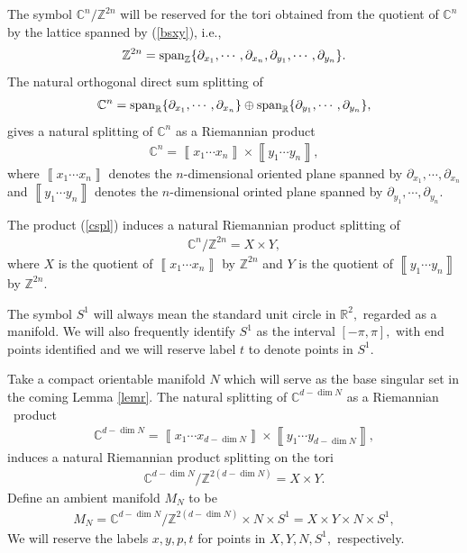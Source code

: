\documentclass[11pt,a4paper]{amsart}
\numberwithin{equation}{section}
\newcommand{\cd}{\cdots}
\newcommand{\cu}[1]{\left\llbracket#1\right\rrbracket}
\newcommand{\cz}{\C^{d-\dim N}/\Z^{2(d-\dim N)}}
\newcommand{\pd}{\partial}
\newcommand{\R}{\mathbb{R}}
\newcommand{\Z}{\mathbb{Z}}
\newcommand{\C}{\mathbb{C}}
\theoremstyle{plain}
\theoremstyle{definition}
\numberwithin{equation}{subsection}
\begin{document}
	The symbol $\C^n/\Z^{2n}$ will be reserved for the tori obtained from the quotient of $\C^n$ by the lattice spanned by (\ref{bsxy}), i.e.,
	\begin{align*}
		\Z^{2n}=\textnormal{span}_{\Z}\{\pd_{x_1},\cd,\pd_{x_n},\pd_{y_1},\cd,\pd_{y_n}\}.
	\end{align*}
	The natural orthogonal direct sum splitting of 
	\begin{align*}
		\C^n=\textnormal{span}_{\R}\{\pd_{x_1},\cd,\pd_{x_n}\}\oplus\textnormal{span}_{\R}\{\pd_{y_1},\cd,\pd_{y_n}\},
	\end{align*}
	gives a natural splitting of $\C^n$ as a Riemannian product
	\begin{align}\label{cspl}
		\C^n=\cu{x_1\cd x_n}\times \cu{y_1\cd y_n},
	\end{align}
	where $\cu{x_1\cd x_n}$ denotes the $n$-dimensional oriented plane spanned by $\pd_{x_1},\cd,\pd_{x_n}$ and $\cu{y_1\cd y_n}$ denotes the $n$-dimensional orinted plane spanned by $\pd_{y_1},\cd,\pd_{y_n}.$
	
	The product (\ref{cspl}) induces a natural Riemannian product splitting of
	\begin{align*}
		\C^n/\Z^{2n}=X\times Y,
	\end{align*}
	where $X$ is the quotient of $\cu{x_1\cd x_n}$ by $\Z^{2n}$ and $Y$ is the quotient of $\cu{y_1\cd y_n}$ by $\Z^{2n}.$
	
	The symbol $S^1$ will always mean the standard unit circle in $\R^2,$ regarded as a manifold. We will also frequently identify $S^1$ as the interval
	$
	[-{\pi}{},{\pi}{}],
	$ with end points identified and we will reserve label $t$ to denote points in $S^1.$	
	
	Take a compact orientable manifold $N$ which will serve as the base singular set in the coming Lemma \ref{lemr}. The natural splitting of $\C^{d-\dim N}$ as a Riemannian  product
	\begin{align*}
		\C^{d-\dim N}=\cu{x_1\cd x_{d-\dim N}}\times \cu{y_1\cd y_{d-\dim N}},
	\end{align*} 
	induces a natural Riemannian product splitting on the tori
	\begin{align*}
		\cz=X\times Y.
	\end{align*}
	Define an ambient manifold $M_N$ to be
	\begin{align}
		M_N=\C^{d-\dim N}/\Z^{2(d-\dim N)}\times N\times S^1=X\times Y\times N\times S^1,
	\end{align}
	We will reserve the labels $x,y,p,t$ for points in $X,Y,N,S^1,$ respectively. 
	
\end{document}
